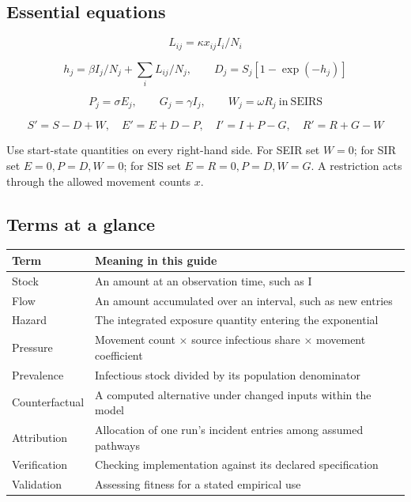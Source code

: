 \documentclass[11pt,a4paper]{article}
\begin{document}
\subsection{Essential equations}\label{essential-equations}

\[
L_{ij}=\kappa x_{ij}I_i/N_i
\]

\[
h_j=\beta I_j/N_j+\sum_i L_{ij}/N_j,\qquad D_j=S_j[1-\exp(-h_j)]
\]

\[
P_j=\sigma E_j,\qquad G_j=\gamma I_j,\qquad W_j=\omega R_j\ \mathrm{in\ SEIRS}
\]

\[
S'=S-D+W,\quad E'=E+D-P,\quad I'=I+P-G,\quad R'=R+G-W
\]

Use start-state quantities on every right-hand side. For SEIR set
\(W = 0\); for SIR set \(E = 0, P = D, W = 0\); for SIS set
\(E = R = 0, P = D, W = G\). A restriction acts through the allowed
movement counts \(x\).

\subsection{Terms at a glance}\label{terms-at-a-glance}

\begin{longtable}[]{@{}
  >{\raggedright\arraybackslash}p{}
  >{\raggedright\arraybackslash}p{}@{}}
\toprule\noalign{}
\begin{minipage}[b]{\linewidth}\raggedright
Term
\end{minipage} & \begin{minipage}[b]{\linewidth}\raggedright
Meaning in this guide
\end{minipage} \\
\midrule\noalign{}
\endhead
\bottomrule\noalign{}
\endlastfoot
Stock & An amount at an observation time, such as I \\
Flow & An amount accumulated over an interval, such as new entries \\
Hazard & The integrated exposure quantity entering the exponential \\
Pressure & Movement count \ensuremath{\times} source infectious share \ensuremath{\times} movement
coefficient \\
Prevalence & Infectious stock divided by its population denominator \\
Counterfactual & A computed alternative under changed inputs within the
model \\
Attribution & Allocation of one run's incident entries among assumed
pathways \\
Verification & Checking implementation against its declared
specification \\
Validation & Assessing fitness for a stated empirical use \\
\end{longtable}
\end{document}
